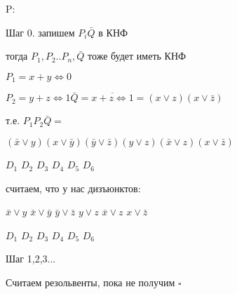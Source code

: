 \documentclass[russian]{lecture-notes}
\begin{document}
	P:

	Шаг 0. запишем $P_{i} \bar{Q}$ в КНФ

	тогда $P_{1},P_{2}..P_{n},\bar{Q}$ тоже будет иметь КНФ

	\begin{example}
		$P_{1} = x + y \Leftrightarrow 0 $

		$P_{2} = y + z \Leftrightarrow 1 \bar{Q} = \overline{x+z\Leftrightarrow 1} = (x \lor z)(x \lor \bar{z})$

		т.е. $P_{1}P_{2}\bar{Q} = $

		$(\bar{x} \lor y)(x \lor \bar{y})(\bar{y} \lor \bar{z})(y \lor z)(\bar{x} \lor z)(x \lor \bar{z})$

		$D_{1}$ \qquad $D_{2}$ \qquad $D_{3}$ \quad $D_{4}$ \quad $D_{5}$ \quad $D_{6}$

		считаем, что у нас дизъюнктов:

		$\bar{x} \lor y$ \quad $\bar{x} \lor \bar{y}$ \quad $\bar{y} \lor \bar{z}$ \quad $y \lor z$ \quad $\bar{x} \lor z $ \quad $x \lor \bar{z}$

		$D_{1}$ \qquad $D_{2}$ \qquad $D_{3}$ \qquad $D_{4}$ \qquad $D_{5}$ \qquad $D_{6}$

		Шаг 1,2,3...

		Считаем резольвенты, пока не получим $\square$
		\end{example}
\end{document}
